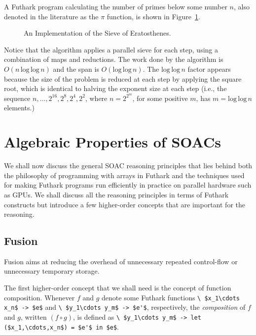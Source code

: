 \documentclass[oneside,11pt]{book}
\renewcommand{\log}{\ensuremath{\mathrm{log}}}
\newenvironment{wrap}{\vspace{\topskip}\par\noindent\begin{minipage}{\linewidth}}{\end{minipage}\par}
\begin{document}
A Futhark program calculating the number of primes below some number
$n$, also denoted in the literature as the $\pi$ function, is shown in
Figure~\ref{fig:primes}.

\begin{figure}
\begin{wrap}

\end{wrap}
\caption{An Implementation of the Sieve of Eratosthenes.}
\label{fig:primes}
\end{figure}

Notice that the algorithm applies a parallel sieve for each step,
using a combination of maps and reductions. The work done by the
algorithm is $O(n\,\log\,\log\,n)$ and the span is
$O(\log\,\log\,n)$. The $\log\,\log\,n$ factor appears because the
size of the problem is reduced at each step by applying the square
root, which is identical to halving the exponent size at each
step (i.e., the sequence $n, \ldots, 2^{16}, 2^8, 2^4, 2^2$, where $n=2^{2^m}$, for some positive $m$, has $m = \log\,\log\,n$ elements.)

\chapter{Algebraic Properties of SOACs}
\label{chap:soac-algebra}

We shall now discuss the general SOAC reasoning principles that lies
behind both the philosophy of programming with arrays in Futhark and
the techniques used for making Futhark programs run efficiently in
practice on parallel hardware such as GPUs. We shall discuss all the
reasoning principles in terms of Futhark constructs but introduce a
few higher-order concepts that are important for the reasoning.

\section{Fusion}

Fusion aims at reducing the overhead of unnecessary repeated
control-flow or unnecessary temporary storage.

The first higher-order concept that we shall need is the concept of
function composition. Whenever $f$ and $g$ denote some Futhark
functions
%
\lstinline[mathescape=true]!\ $x_1\cdots x_n$ -> $e$! and
%
\lstinline[mathescape=true]!\ $y_1\cdots y_m$ -> $e'$!, respectively, the
\emph{composition} of $f$ and $g$, written $(f \circ g)$, is defined as
%
\lstinline[mathescape=true]!\ $y_1\cdots y_m$ -> let ($x_1,\cdots,x_n$) = $e'$ in $e$!.
\end{document}
